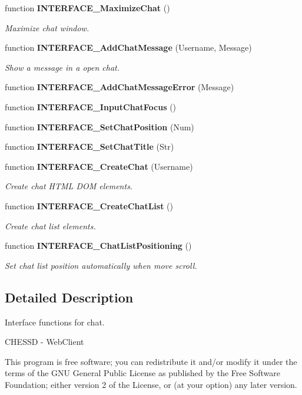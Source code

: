 \begin{CompactItemize}
function {\bf INTERFACE\_\-MaximizeChat} ()
\begin{CompactList}\small\item\em Maximize chat window. \item\end{CompactList}\item 
function {\bf INTERFACE\_\-AddChatMessage} (Username, Message)
\begin{CompactList}\small\item\em Show a message in a open chat. \item\end{CompactList}\item 
function {\bf INTERFACE\_\-AddChatMessageError} (Message)
\item 
function {\bf INTERFACE\_\-InputChatFocus} ()
\item 
function {\bf INTERFACE\_\-SetChatPosition} (Num)
\item 
function {\bf INTERFACE\_\-SetChatTitle} (Str)
\item 
function {\bf INTERFACE\_\-CreateChat} (Username)
\begin{CompactList}\small\item\em Create chat HTML DOM elements. \item\end{CompactList}\item 
function {\bf INTERFACE\_\-CreateChatList} ()
\begin{CompactList}\small\item\em Create chat list elements. \item\end{CompactList}\item 
function {\bf INTERFACE\_\-ChatListPositioning} ()
\begin{CompactList}\small\item\em Set chat list position automatically when move scroll. \item\end{CompactList}\end{CompactItemize}


\subsection{Detailed Description}
Interface functions for chat. 

CHESSD - WebClient

This program is free software; you can redistribute it and/or modify it under the terms of the GNU General Public License as published by the Free Software Foundation; either version 2 of the License, or (at your option) any later version.

